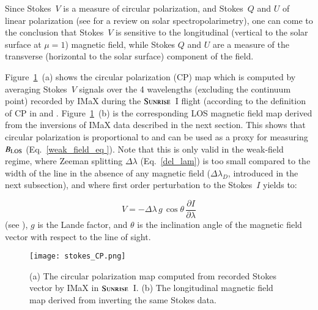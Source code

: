 \documentclass[goettingen, gauss, print]{thesis}
\begin{document}
Since Stokes~$V$ is a measure of circular polarization, and Stokes~$Q$ and $U$ of linear polarization (see \cite{stenflo_solar_2013} for a review on solar spectropolarimetry), one can come to the conclusion that Stokes~$V$ is sensitive to the longitudinal (vertical to the solar surface at $\mu=1$) magnetic field, while Stokes $Q$ and $U$ are a measure of the transverse (horizontal to the solar surface) component of the field.

Figure~\ref{CP}~(a) shows the circular polarization (CP) map which is computed by averaging Stokes~$V$ signals over the 4 wavelengths (excluding the continuum point) recorded by IMaX during the $\textsc{Sunrise}$~I flight (according to the definition of CP in \cite{riethmuller_bright_2010} and \cite{jafarzadeh_structure_2013}. Figure~\ref{CP}~(b) is the corresponding LOS magnetic field map derived from the inversions of IMaX data described in the next section. This shows that circular polarization is proportional to and can be used as a proxy for measuring $B_{\rm LOS}$ (Eq.~\ref{weak_field_eq }). Note that this is only valid in the weak-field regime, where Zeeman splitting $\Delta \lambda$ (Eq.~\ref{del_lam}) is too small compared to the width of the line in the absence of any magnetic field ($\Delta \lambda_D$, introduced in the next subsection), and where first order perturbation to the Stokes~$I$ yields to:

\begin{equation}
V = -\Delta \lambda \,g \,\cos\theta \,\frac{\partial I}{\partial \lambda} 
\label{weak_field_eq }
\end{equation}
(see \cite{landi_deglinnocenti_polarization_2004}), $g$ is the Lande factor, and $\theta$ is the inclination angle of the magnetic field vector with respect to the line of sight.

\begin{figure}
\centering
\texttt{[image: stokes\_CP.png]}
\caption{(a) The circular polarization map computed from recorded Stokes vector by IMaX in $\textsc{Sunrise}$~I. (b) The longitudinal magnetic field map derived from inverting the same Stokes data. }
\label{CP}
\end{figure}

\end{document}
